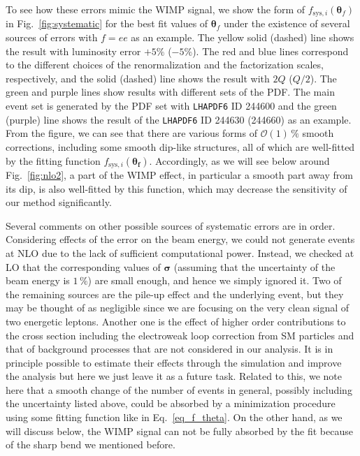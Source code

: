 \documentclass[12pt,twoside,book]{article}
\begin{document}
To see how these errors mimic the WIMP signal, we show the form of $f_{\mathrm{sys},i} (\bm{\theta}_f)$ in Fig.~\ref{fig:systematic} for the best fit values of $\bm{\theta}_f$ under the existence of several sources of errors with $f=ee$ as an example.
The yellow solid (dashed) line shows the result with luminosity error $+5\%$ ($-5\%$).
The red and blue lines correspond to the different choices of the renormalization and the factorization scales, respectively, and the solid (dashed) line shows the result with $2Q$ ($Q/2$).
The green and purple lines show results with different sets of the PDF.
The main event set is generated by the PDF set with \texttt{LHAPDF6} ID 244600 and the green (purple) line shows the result of the \texttt{LHAPDF6} ID 244630 (244660) as an example.
From the figure, we can see that there are various forms of $\mathcal{O}(1)\,\%$ smooth corrections, including some smooth dip-like structures, all of which are well-fitted by the fitting function $f_{\mathrm{sys},i}(\bm{\theta_f})$.
Accordingly, as we will see below around Fig.~\ref{fig:nlo2}, a part of the WIMP effect, in particular a smooth part away from its dip, is also well-fitted by this function, which may decrease the sensitivity of our method significantly.

Several comments on other possible sources of systematic errors are in order.
Considering effects of the error on the beam energy, we could not generate events at NLO due to the lack of sufficient computational power.
Instead, we checked at LO that the corresponding values of $\bm{\sigma}$ (assuming that the uncertainty of the beam energy is $1\,\%$) are small enough, and hence we simply ignored it.
Two of the remaining sources are the pile-up effect and the underlying event, but they may be thought of as negligible since we are focusing on the very clean signal of two energetic leptons.
Another one is the effect of higher order contributions to the cross section including the electroweak loop correction from SM particles and that of background processes that are not considered in our analysis.
It is in principle possible to estimate their effects through the simulation and improve the analysis but here we just leave it as a future task.
Related to this, we note here that a smooth change of the number of events in general, possibly including the uncertainty listed above, could be absorbed by a minimization procedure using some fitting function like in Eq.~\eqref{eq_f_theta}.
On the other hand, as we will discuss below, the WIMP signal can not be fully absorbed by the fit because of the sharp bend we mentioned before.
\end{document}
